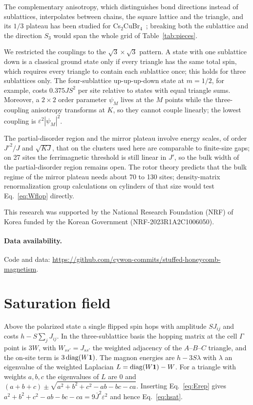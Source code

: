 \documentclass[prb,twocolumn,superscriptaddress,amsmath,amssymb,floatfix]{revtex4-2}
\newcommand{\Jb}{\bar J}
\begin{document}
The complementary anisotropy, which distinguishes bond directions instead of sublattices, interpolates between chains, the square lattice and the triangle, and its $1/3$ plateau has been studied for Cs$_2$CuBr$_4$~\cite{Alicea2009}; breaking both the sublattice and the direction $S_3$ would span the whole grid of Table~\ref{tab:pieces}.

We restricted the couplings to the $\sqrt3\times\sqrt3$ pattern. A state with one sublattice down is a classical ground state only if every triangle has the same total spin, which requires every triangle to contain each sublattice once; this holds for three sublattices only. The four-sublattice up-up-up-down state at $m=1/2$, for example, costs $0.375JS^2$ per site relative to states with equal triangle sums. Moreover, a $2\times2$ order parameter $\psi_M$ lives at the $M$ points while the three-coupling anisotropy transforms at $K$, so they cannot couple linearly; the lowest coupling is $\varepsilon^2|\psi_M|^2$.

The partial-disorder region and the mirror plateau involve energy scales, of order $J'^2/J$ and $\sqrt{KJ}$, that on the clusters used here are comparable to finite-size gaps; on 27 sites the ferrimagnetic threshold is still linear in $J'$, so the bulk width of the partial-disorder region remains open. The rotor theory predicts that the bulk regime of the mirror plateau needs about 70 to 130 sites; density-matrix renormalization group calculations on cylinders of that size would test Eq.~\eqref{eq:Wflop} directly.

\begin{acknowledgments}
This research was supported by the National Research Foundation (NRF) of Korea funded by the Korean Government (NRF-2023R1A2C1006050).
\end{acknowledgments}

\paragraph*{Data availability.} Code and data: \url{https://github.com/cywon-commits/stuffed-honeycomb-magnetism}.

\appendix

\section{Saturation field}
\label{app:hsat}
Above the polarized state a single flipped spin hops with amplitude $SJ_{ij}$ and costs $h-S\sum_jJ_{ij}$. In the three-sublattice basis the hopping matrix at the cell $\Gamma$ point is $3W$, with $W_{ss'}=J_{ss'}$ the weighted adjacency of the $A$--$B$--$C$ triangle, and the on-site term is $3\,{\rm diag}(W\mathbf 1)$. The magnon energies are $h-3S\lambda$ with $\lambda$ an eigenvalue of the weighted Laplacian $L={\rm diag}(W\mathbf 1)-W$. For a triangle with weights $a,b,c$ the eigenvalues of $L$ are $0$ and $(a+b+c)\pm\sqrt{a^2+b^2+c^2-ab-bc-ca}$. Inserting Eq.~\eqref{eq:Erep} gives $a^2+b^2+c^2-ab-bc-ca=9\Jb^2\varepsilon^2$ and hence Eq.~\eqref{eq:hsat}.
\end{document}
